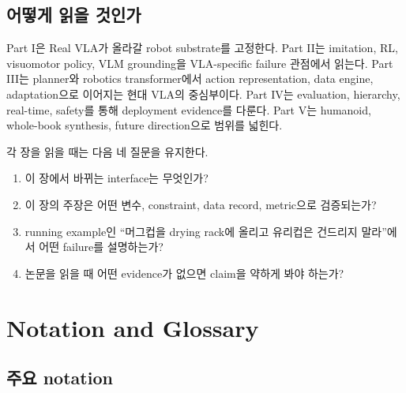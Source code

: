 \section*{어떻게 읽을 것인가}

Part I은 Real VLA가 올라갈 robot substrate를 고정한다. Part II는 imitation, RL, visuomotor policy, VLM grounding을 VLA-specific failure 관점에서 읽는다. Part III는 planner와 robotics transformer에서 action representation, data engine, adaptation으로 이어지는 현대 VLA의 중심부이다. Part IV는 evaluation, hierarchy, real-time, safety를 통해 deployment evidence를 다룬다. Part V는 humanoid, whole-book synthesis, future direction으로 범위를 넓힌다.

각 장을 읽을 때는 다음 네 질문을 유지한다.

\begin{enumerate}
  \item 이 장에서 바뀌는 interface는 무엇인가?
  \item 이 장의 주장은 어떤 변수, constraint, data record, metric으로 검증되는가?
  \item running example인 ``머그컵을 drying rack에 올리고 유리컵은 건드리지 말라''에서 어떤 failure를 설명하는가?
  \item 논문을 읽을 때 어떤 evidence가 없으면 claim을 약하게 봐야 하는가?
\end{enumerate}

\chapter*{Notation and Glossary}

\section*{주요 notation}


